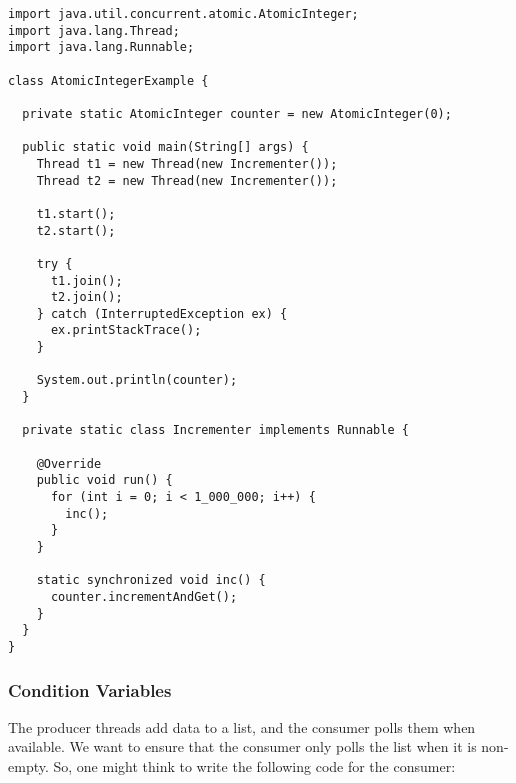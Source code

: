 \begin{lstlisting}[language=MyJava]
import java.util.concurrent.atomic.AtomicInteger;
import java.lang.Thread;
import java.lang.Runnable;

class AtomicIntegerExample {

  private static AtomicInteger counter = new AtomicInteger(0);

  public static void main(String[] args) {
    Thread t1 = new Thread(new Incrementer());
    Thread t2 = new Thread(new Incrementer());

    t1.start();
    t2.start();

    try {
      t1.join();
      t2.join();
    } catch (InterruptedException ex) { 
      ex.printStackTrace(); 
    }

    System.out.println(counter);
  }

  private static class Incrementer implements Runnable {

    @Override
    public void run() {
      for (int i = 0; i < 1_000_000; i++) { 
        inc(); 
      }
    }

    static synchronized void inc() {
      counter.incrementAndGet();
    }
  }
}
\end{lstlisting}



\subsubsection*{Condition Variables}

The producer threads add data to a list, and the consumer polls them when available. 
We want to ensure that the consumer only polls the list when it is non-empty. 
So, one might think to write the following code for the consumer:

